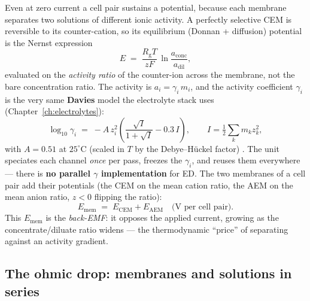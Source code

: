 \documentclass[11pt,a4paper]{article}
\newcommand{\Rgas}{R_{\!\mathrm{g}}}                %
\begin{document}
Even at zero current a cell pair sustains a potential, because each
membrane separates two solutions of different ionic activity.  A perfectly
selective CEM is reversible to its counter-cation, so its equilibrium
(Donnan + diffusion) potential is the Nernst expression
%
\begin{equation}
  E \;=\; \frac{\Rgas T}{z F}\,
          \ln\!\frac{a_{\text{conc}}}{a_{\text{dil}}},
  \label{eq:ed-nernst}
\end{equation}
%
evaluated on the \emph{activity ratio} of the counter-ion across the
membrane, not the bare concentration ratio.  The activity is $a_i =
\gamma_i\,m_i$, and the activity coefficient $\gamma_i$ is the very same
\textbf{Davies} model the electrolyte stack uses
(Chapter~\ref{ch:electrolytes}):
%
\begin{equation}
  \log_{10}\gamma_i \;=\;
    -A\,z_i^2\!\left(\frac{\sqrt I}{1+\sqrt I} - 0.3\,I\right),
  \qquad
  I = \tfrac12\sum_k m_k z_k^2,
  \label{eq:ed-davies}
\end{equation}
%
with $A = 0.51$ at $25^\circ$C (scaled in $T$ by the Debye--H\"uckel
factor) \cite{Davies1962}.  The unit speciates each channel \emph{once}
per pass, freezes the $\gamma_i$, and reuses them everywhere --- there is
\textbf{no parallel $\gamma$ implementation} for ED.  The two membranes of
a cell pair add their potentials (the CEM on the mean cation ratio, the
AEM on the mean anion ratio, $z<0$ flipping the ratio):
%
\begin{equation}
  E_\text{mem} \;=\; E_\text{CEM} + E_\text{AEM}
  \quad\text{(V per cell pair)}.
  \label{eq:ed-emem}
\end{equation}
%
This $E_\text{mem}$ is the \emph{back-EMF}: it opposes the applied
current, growing as the concentrate/diluate ratio widens --- the
thermodynamic ``price'' of separating against an activity gradient.

\subsection{The ohmic drop: membranes and solutions in series}
\end{document}

